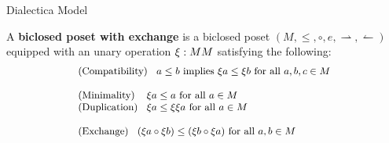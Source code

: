 \documentclass{beamer}
\let\to\relax
\newcommand{\rto}{\leftharpoonup}
\newcommand{\lto}{\rightharpoonup}
\begin{document}
\begin{frame}{Dialectica Model}
  \begin{definition}
  \label{def:biclosed-exchange}
  A \textbf{biclosed poset with exchange} is a biclosed poset $(M,
  \leq, \circ, e, \lto, \rto)$ equipped with an unary operation
  $\xi : M \to M$ satisfying the following:
  \[ \small
  \setlength{\arraycolsep}{4px}
  \begin{array}{lll}
    \begin{array}{lll}
    \text{(Compatibility)} & a \leq b \text{ implies } \xi a \leq \xi b \text{ for all } a,b,c \in M\\    
  \end{array}
  \\\\
  \begin{array}{lll}
    \text{(Minimality)} & \xi a \leq a \text{ for all } a \in M\\    
    \text{(Duplication)} & \xi a \leq \xi\xi a \text{ for all } a \in M\\
  \end{array}
  \\\\
  \begin{array}{lll}
    \text{(Exchange)} & (\xi a \circ \xi b) \leq (\xi b \circ \xi a) \text{ for all } a, b \in M\\
  \end{array}
  \end{array}
  \]
\end{definition}
\end{frame}
\end{document}
